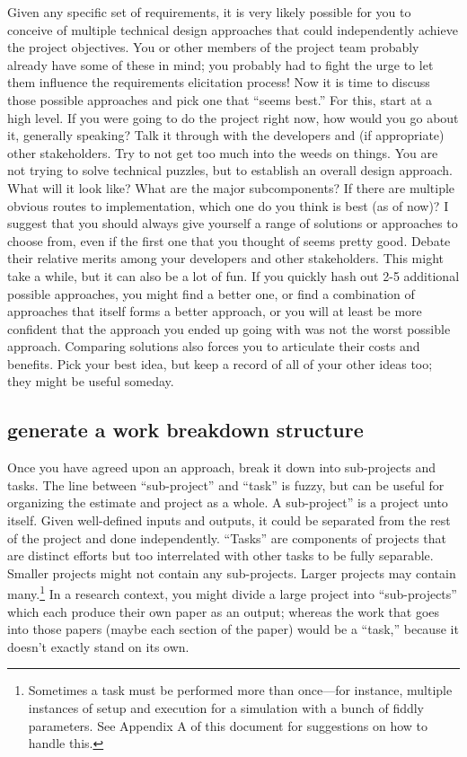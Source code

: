 \documentclass[12pt,oneside]{book}
\begin{document}
Given any specific set of requirements, it is very likely possible for you to conceive of multiple technical design approaches that could independently achieve the project objectives. You or other members of the project team probably already have some of these in mind; you probably had to fight the urge to let them influence the requirements elicitation process! Now it is time to discuss those possible approaches and pick one that ``seems best.''
For this, start at a high level. If you were going to do the project right now, how would you go about it, generally speaking? Talk it through with the developers and (if appropriate) other stakeholders. Try to not get too much into the weeds on things. You are not trying to solve technical puzzles, but to establish an overall design approach. What will it look like? What are the major subcomponents? If there are multiple obvious routes to implementation, which one do you think is best (as of now)?
I suggest that you should always give yourself a range of solutions or approaches to choose from, even if the first one that you thought of seems pretty good. Debate their relative merits among your developers and other stakeholders. This might take a while, but it can also be a lot of fun. If you quickly hash out 2-5 additional possible approaches, you might find a better one, or find a combination of approaches that itself forms a better approach, or you will at least be more confident that the approach you ended up going with was not the worst possible approach. Comparing solutions also forces you to articulate their costs and benefits. Pick your best idea, but keep a record of all of your other ideas too; they might be useful someday.

\subsection*{generate a work breakdown structure}
\label{scrivauto:30}

Once you have agreed upon an approach, break it down into sub-projects and tasks. The line between ``sub-project'' and ``task'' is fuzzy, but can be useful for organizing the estimate and project as a whole. A sub-project'' is a project unto itself. Given well-defined inputs and outputs, it could be separated from the rest of the project and done independently. ``Tasks'' are components of projects that are distinct efforts but too interrelated with other tasks to be fully separable. Smaller projects might not contain any sub-projects. Larger projects may contain many.\footnote{
Sometimes a task must be performed more than once—for instance, multiple instances of setup and execution for a simulation with a bunch of fiddly parameters. See Appendix A of this document for suggestions on how to handle this.} 
In a research context, you might divide a large project into ``sub-projects'' which each produce their own paper as an output; whereas the work that goes into those papers (maybe each section of the paper) would be a ``task,'' because it doesn't exactly stand on its own.
\end{document}
